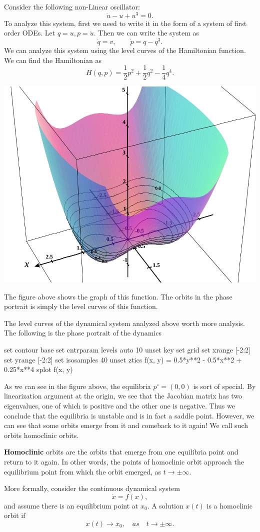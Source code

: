 \begin{example}
	Consider the following non-Linear oscillator:
	\[ \ddot{u} - u + u^3 = 0. \]
	To analyze this system, first we need to write it in the form of a system of first order ODEs. Let $q = u, p = \dot{u}$. Then we can write the system as
	\[ \dot{q} = v, \qquad \dot{p}=q - q^3. \]
	We can analyze this system using the level curves of the Hamiltonian function. We can find the Hamiltonian as
	\[ H(q,p) = \frac{1}{2} p^2 + \frac{1}{2} q^2 - \frac{1}{4} q^4 . \]

	\begin{center}
		\includegraphics[width=0.4\linewidth]{HamiltonianExample1}
	\end{center}
	
	The figure above shows the graph of this function. The orbits in the phase portrait is simply the level curves of this function. 
\end{example}

The level curves of the dynamical system analyzed above worth more analysis. The following is the phase portrait of the dynamics


\begin{gnuplot}[terminal=epslatex, terminaloptions=color]
	set contour base
	set cntrparam levels auto 10
	unset key
	set grid
	set xrange [-2:2]
	set yrange [-2:2]
	set isosamples 40
	unset ztics
	f(x, y) = 0.5*y**2 - 0.5*x**2 + 0.25*x**4
	splot f(x, y)
\end{gnuplot}

As we can see in the figure above, the equilibria $p^\circ = (0,0)$ is sort of special. By linearization argument at the origin, we see that the Jacobian matrix has two eigenvalues, one of which is positive and the other one is negative. Thus we conclude that the equilibria is unstable and is in fact a saddle point. However, we can see that some orbits emerge from it and comeback to it again! We call such orbits homoclinic orbits. 

\begin{defbox}
	\textbf{Homoclinic} orbits are the orbits that emerge from one equilibria point and return to it again. In other words, the points of homoclinic orbit approach the equilibrium point from which the orbit emerged, as $t\to\pm\infty$.
	
	More formally, consider the continuous dynamical system 
	\[ \dot{x} = f(x), \]
	and assume there is an equilibrium point at $x_0$. A solution $x(t)$ is a homoclinic orbit if
	\[ x(t) \to x_0,\quad as \quad t\to\pm\infty. \]
\end{defbox}

